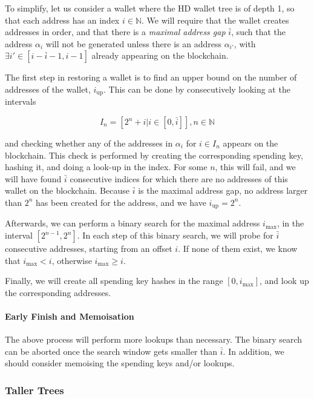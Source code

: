 \documentclass[11pt,a4paper]{article}
\begin{document}
To simplify, let us consider a wallet where the HD wallet tree is of
depth 1, so that each address has an index \(i \in \mathbb{N}\). We will
require that the wallet creates addresses in order, and that there is a
\emph{maximal address gap} \(\bar{i}\), such that the address
\(\alpha_i\) will not be generated unless there is an address
\(\alpha_{i'}\), with \(\exists i' \in [i-\bar{i}-1, i-1]\) already
appearing on the blockchain.

The first step in restoring a wallet is to find an upper bound on the
number of addresses of the wallet, \(i_{\text{up}}\). This can be done
by consecutively looking at the intervals

\[
I_{n} = [2^n + i | i \in [0, \bar{i}]], n \in \mathbb{N}
\]

and checking whether any of the addresses in \(\alpha_i\) for
\(i \in I_{n}\) appears on the blockchain. This check is performed by
creating the corresponding spending key, hashing it, and doing a look-up
in the index. For some \(n\), this will fail, and we will have found
\(\bar{i}\) consecutive indices for which there are no addresses of this
wallet on the blockchain. Because \(\bar{i}\) is the maximal address
gap, no address larger than \(2^n\) has been created for the address,
and we have \(i_\text{up} = 2^n\).

Afterwards, we can perform a binary search for the maximal address
\(i_\text{max}\), in the interval \([2^{n-1}, 2^n]\). In each step of
this binary search, we will probe for \(\bar{i}\) consecutive addresses,
starting from an offset \(i\). If none of them exist, we know that
\(i_\text{max} < i\), otherwise \(i_\text{max} \geq i\).

Finally, we will create all spending key hashes in the range
\([0, i_\text{max}]\), and look up the corresponding addresses.

\paragraph{Early Finish and Memoisation}

The above process will perform more lookups than necessary. The binary
search can be aborted once the search window gets smaller than
\(\bar{i}\). In addition, we should consider memoising the spending keys
and/or lookups.

\subsubsection{Taller Trees}
\label{taller-trees}
\end{document}
